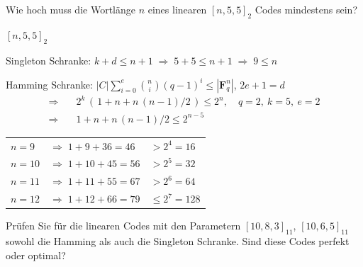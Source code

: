 \begin{aufgabe}[5\_7]
Wie hoch muss die Wortlänge $n$ eines linearen $[n, 5, 5]_2$ Codes mindestens sein?
\end{aufgabe}

\begin{loesung}
$[n, 5, 5]_2$

Singleton Schranke: \quad $k + d \le n + 1 \;\Rightarrow\; 5 + 5 \le n + 1 \;\Rightarrow\; 9 \le n$

Hamming Schranke: \quad $|C| \displaystyle\sum_{i=0}^{e} \binom{n}{i} (q-1)^i \le |\mathbf{F}_q^n|$, \quad $2e + 1 = d$
\begin{align*}
\Rightarrow\quad & 2^k\,(\,1 + n + n\,(n-1)/2\,) \le 2^n, \quad q = 2,\ k = 5,\ e = 2\\
\Rightarrow\quad & 1 + n + n\,(n-1)/2 \le 2^{n-5}
\end{align*}
\begin{tabular}{lll}
$n = 9$ & $\Rightarrow\; 1 + 9 + 36 = 46$ & $> 2^4 = 16$\\
$n = 10$ & $\Rightarrow\; 1 + 10 + 45 = 56$ & $> 2^5 = 32$\\
$n = 11$ & $\Rightarrow\; 1 + 11 + 55 = 67$ & $> 2^6 = 64$\\
$n = 12$ & $\Rightarrow\; 1 + 12 + 66 = 79$ & $\le 2^7 = 128$
\end{tabular}
\end{loesung}

\begin{aufgabe}[5\_8]
Prüfen Sie für die linearen Codes mit den Parametern $[10, 8, 3]_{11}$, $[10, 6, 5]_{11}$ sowohl die Hamming als auch die Singleton Schranke. Sind diese Codes perfekt oder optimal?
\end{aufgabe}


